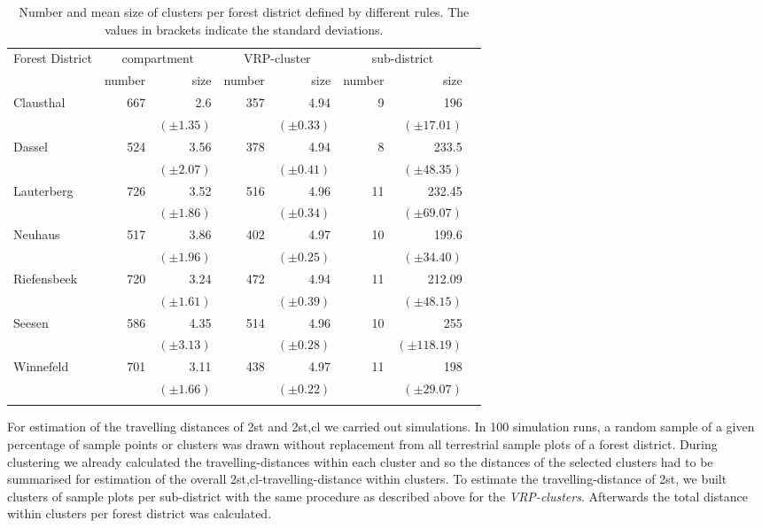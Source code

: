 \begin{table*}
\begin{center}
\caption{Number and mean size of clusters per forest district defined by different rules. The values in brackets indicate the standard deviations.}
\label{tab:table_2}
\small{
\begin{tabular}{lrrrrrrr}
\hline\noalign{\smallskip}
 Forest \linebreak District & \multicolumn{2}{c}{compartment} & \multicolumn{2}{c}{VRP-cluster} &  \multicolumn{2}{c}{sub-district}\\
\cmidrule(lr){2-3}\cmidrule(lr){4-5}\cmidrule(lr){6-7}
&number&size&number&size&number&size\\
\noalign{\smallskip}\hline\noalign{\smallskip}
Clausthal &  667  &2.6&  357&4.94&9 & 196\\
&&$(\pm 1.35)$&&$(\pm 0.33)$&& $(\pm 17.01)$\\
Dassel &  524  & 3.56 &378&4.94&8 &233.5\\
&&$(\pm 2.07)$&&$(\pm 0.41)$&& $(\pm 48.35)$\\
Lauterberg &  726  & 3.52& 516&4.96& 11& 232.45\\
&&$(\pm 1.86)$&&$(\pm 0.34)$&& $(\pm 69.07)$\\
Neuhaus &  517  & 3.86&402 &4.97&10 & 199.6\\
&&$(\pm 1.96)$&&$(\pm 0.25)$&& $(\pm 34.40)$\\
Riefensbeek &  720&  3.24& 472&4.94&11 &  212.09\\
&&$(\pm 1.61)$&&$(\pm 0.39)$&& $(\pm 48.15)$\\
Seesen &  586  & 4.35&514 &4.96&10 & 255\\
&&$(\pm 3.13)$&&$(\pm 0.28)$&& $(\pm 118.19)$\\
Winnefeld &  701 & 3.11&  438 &4.97&11 &198\\
&&$(\pm 1.66)$&&$(\pm 0.22)$&& $(\pm 29.07)$\\
\noalign{\smallskip}\hline
\end{tabular}}
\end{center}
\end{table*}
For estimation of the travelling distances of 2st and 2st,cl we carried out simulations. In 100 simulation runs, a random sample of a given percentage of sample points or clusters was drawn without replacement from all terrestrial sample plots of a forest district. During clustering we already calculated the travelling-distances within each cluster and so the distances of the selected clusters had to be summarised for estimation of the overall 2st,cl-travelling-distance within clusters. To estimate the travelling-distance of 2st, we built clusters of sample plots per sub-district with the same procedure as described above for the \textit{VRP-clusters}. Afterwards the total distance within clusters per forest district was calculated.
